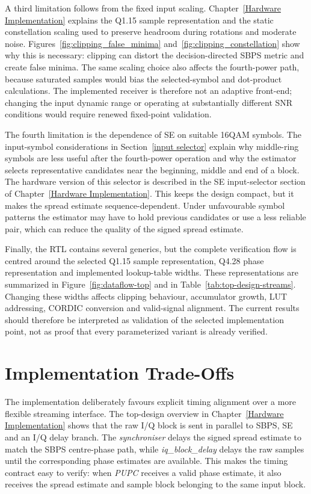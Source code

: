 A third limitation follows from the fixed input scaling. Chapter~\ref{Hardware Implementation} explains the Q1.15 sample representation and the static constellation scaling used to preserve headroom during rotations and moderate noise. Figures~\ref{fig:clipping_false_minima} and~\ref{fig:clipping_constellation} show why this is necessary: clipping can distort the decision-directed \ac{SBPS} metric and create false minima. The same scaling choice also affects the fourth-power path, because saturated samples would bias the selected-symbol and dot-product calculations. The implemented receiver is therefore not an adaptive front-end; changing the input dynamic range or operating at substantially different \ac{SNR} conditions would require renewed fixed-point validation.

The fourth limitation is the dependence of \ac{SE} on suitable \ac{16QAM} symbols. The input-symbol considerations in Section~\ref{input selector} explain why middle-ring symbols are less useful after the fourth-power operation and why the estimator selects representative candidates near the beginning, middle and end of a block. The hardware version of this selector is described in the \ac{SE} input-selector section of Chapter~\ref{Hardware Implementation}. This keeps the design compact, but it makes the spread estimate sequence-dependent. Under unfavourable symbol patterns the estimator may have to hold previous candidates or use a less reliable pair, which can reduce the quality of the signed spread estimate.

Finally, the \ac{RTL} contains several generics, but the complete verification flow is centred around the selected Q1.15 sample representation, Q4.28 phase representation and implemented lookup-table widths. These representations are summarized in Figure~\ref{fig:dataflow-top} and in Table~\ref{tab:top-design-streams}. Changing these widths affects clipping behaviour, accumulator growth, \ac{LUT} addressing, \ac{CORDIC} conversion and valid-signal alignment. The current results should therefore be interpreted as validation of the selected implementation point, not as proof that every parameterized variant is already verified.

\section{Implementation Trade-Offs}

The implementation deliberately favours explicit timing alignment over a more flexible streaming interface. The top-design overview in Chapter~\ref{Hardware Implementation} shows that the raw I/Q block is sent in parallel to \ac{SBPS}, \ac{SE} and an I/Q delay branch. The \textit{synchroniser} delays the signed spread estimate to match the \ac{SBPS} centre-phase path, while \textit{iq\_block\_delay} delays the raw samples until the corresponding phase estimates are available. This makes the timing contract easy to verify: when \textit{PUPC} receives a valid phase estimate, it also receives the spread estimate and sample block belonging to the same input block.

